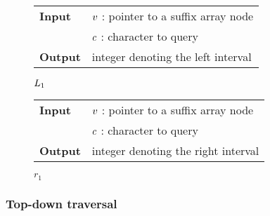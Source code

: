\begin{figure*}[t!]
\begin{minipage}[t]{.5\textwidth}
\begin{algorithm}[H]
\begin{tabular}{ll}
\textbf{Input}  & $v$ : pointer to a suffix array node\\
				& $c$ : character to query\\
\textbf{Output} & integer denoting the left interval\\
\end{tabular}
\begin{algorithmic}[1]
	\Else
	\EndIf
\EndWhile
\State \Return $L_1$
\end{algorithmic}
\label{alg:sa-lower}
\end{algorithm}
\end{minipage}
\hfill
\begin{minipage}[t]{.5\textwidth}
\begin{algorithm}[H]
\begin{tabular}{ll}
\textbf{Input}  & $v$ : pointer to a suffix array node\\
				& $c$ : character to query\\
\textbf{Output} & integer denoting the right interval\\
\end{tabular}
\begin{algorithmic}[1]
	\Else
	\EndIf
\EndWhile
\State \Return $r_1$
\end{algorithmic}
\label{alg:sa-upper}
\end{algorithm}
\end{minipage}
\end{figure*}

\subsubsection{Top-down traversal}

